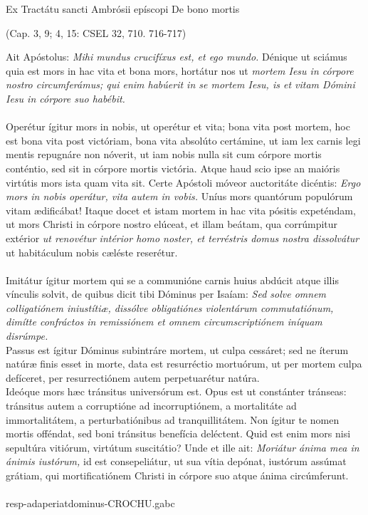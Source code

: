 \documentclass[options]{article}
\begin{document}
	Ex Tractátu sancti Ambrósii epíscopi De bono mortis
	\begin{flushright}
		(Cap. 3, 9; 4, 15: CSEL 32, 710. 716-717)
	\end{flushright}
Ait Apóstolus: \emph{Mihi mundus crucifíxus est, et ego mundo.}
Dénique ut sciámus quia est mors in hac vita et bona mors, hortátur nos ut
\emph{mortem Iesu in córpore nostro circumferámus; qui enim habúerit in se mortem Iesu, is et vitam Dómini Iesu in córpore suo habébit.}\\
\\
Operétur ígitur mors in nobis, ut operétur et vita; bona vita post mortem, hoc est bona vita post victóriam, bona vita absolúto certámine, ut iam lex carnis legi mentis repugnáre non nóverit, ut iam nobis nulla sit cum córpore mortis conténtio, sed sit in córpore mortis victória. Atque haud scio ipse an maióris virtútis mors ista quam vita sit. Certe Apóstoli móveor auctoritáte dicéntis:
\emph{Ergo mors in nobis operátur, vita autem in vobis.}
Uníus mors quantórum populórum vitam ædificábat! Itaque docet et istam mortem in hac vita pósitis expeténdam, ut mors Christi in córpore nostro elúceat, et illam beátam, qua corrúmpitur extérior
 \emph{ut renovétur intérior homo noster, et terréstris domus nostra dissolvátur}
 ut habitáculum nobis cæléste reserétur. \\
 \\
  Imitátur ígitur mortem qui se a communióne carnis huius abdúcit atque illis vínculis solvit, de quibus dicit tibi Dóminus per Isaíam:
  \emph{Sed solve omnem colligatiónem iniustítiæ, dissólve obligatiónes violentárum commutatiónum, dimítte confráctos in remissiónem et omnem circumscriptiónem iníquam disrúmpe.}\\
    Passus est ígitur Dóminus subintráre mortem, ut culpa cessáret; sed ne íterum natúræ finis esset in morte, data est resurréctio mortuórum, ut per mortem culpa defíceret, per resurrectiónem autem perpetuarétur natúra.\\
     Ideóque mors hæc tránsitus universórum est. Opus est ut constánter tránseas: tránsitus autem a corruptióne ad incorruptiónem, a mortalitáte ad immortalitátem, a perturbatiónibus ad tranquillitátem. Non ígitur te nomen mortis offéndat, sed boni tránsitus benefícia deléctent. Quid est enim mors nisi sepultúra vitiórum, virtútum suscitátio? Unde et ille ait: 
     \emph{Moriátur ánima mea in ánimis iustórum,}
      id est consepeliátur, ut sua vítia depónat, iustórum assúmat grátiam, qui mortificatiónem Christi in córpore suo atque ánima circúmferunt.\\
      \\
      resp-adaperiatdominus-CROCHU.gabc
\end{document}
